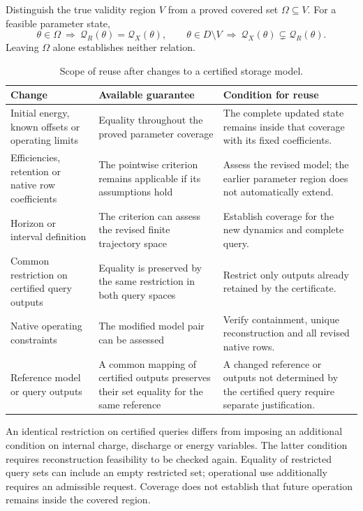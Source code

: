 Distinguish the true validity region $V$ from a proved
covered set $\Omega\subseteq V$. For a feasible parameter state,
\begin{equation}
\theta\in\Omega\ \Longrightarrow\ \mathcal Q_R(\theta)=\mathcal Q_X(\theta),
\qquad
\theta\in D\setminus V\ \Longrightarrow\
\mathcal Q_X(\theta)\subsetneq\mathcal Q_R(\theta).
\label{eq:coverage}
\end{equation}
Leaving $\Omega$ alone establishes neither relation.





\begin{table}[htbp]

\caption{Scope of reuse after changes to a certified storage model.}
\label{tab:si_certificate_reuse}

\begin{tabularx}{\linewidth}{@{}p{.25\linewidth}XX@{}}
\toprule
Change & Available guarantee & Condition for reuse\\
\midrule
Initial energy, known offsets or operating limits
& Equality throughout the proved parameter coverage
& The complete updated state remains inside that coverage with its fixed coefficients.\\
Efficiencies, retention or native row coefficients
& The pointwise criterion remains applicable if its assumptions hold
& Assess the revised model; the earlier parameter region does not automatically extend.\\
Horizon or interval definition
& The criterion can assess the revised finite trajectory space
& Establish coverage for the new dynamics and complete query.\\
Common restriction on certified query outputs
& Equality is preserved by the same restriction in both query spaces
& Restrict only outputs already retained by the certificate.\\
Native operating constraints
& The modified model pair can be assessed
& Verify containment, unique reconstruction and all revised native rows.\\
Reference model or query outputs
& A common mapping of certified outputs preserves their set equality for the same reference
& A changed reference or outputs not determined by the certified query require separate justification.\\
\bottomrule
\end{tabularx}
\end{table}

An identical restriction on certified queries differs from imposing an
additional condition on internal charge, discharge or energy variables.
The latter condition requires reconstruction feasibility to be checked
again. Equality of restricted query sets can include an empty restricted
set; operational use additionally requires an admissible request.
Coverage does not establish that future operation remains inside the
covered region.


